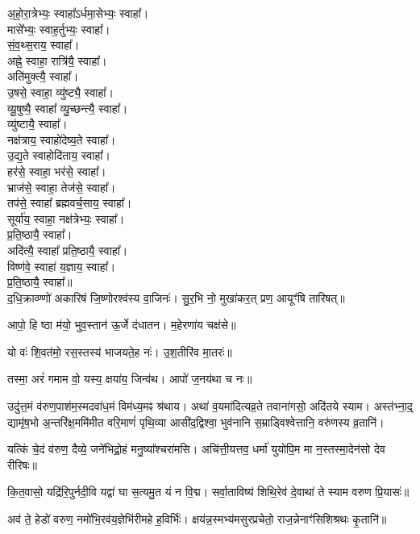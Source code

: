 अ॒हो॒रा॒त्रेभ्यः॒ स्वाहा᳚ऽर्धमा॒सेभ्यः॒ स्वाहा᳚।\\
मासे᳚भ्यः॒ स्वाह॒र्तुभ्यः॒ स्वाहा᳚।\\
सं॒व॒थ्स॒राय॒ स्वाहा᳚।\\
अह्ने॒ स्वाहा॒ रात्रि॑यै॒ स्वाहा᳚।\\
अति॑मुक्त्यै॒ स्वाहा᳚।\\
उ॒षसे॒ स्वाहा॒ व्यु॑ष्ट्यै॒ स्वाहा᳚।\\
व्यू॒षुष्यै॒ स्वाहा᳚ व्यु॒च्छन्त्यै॒ स्वाहा᳚।\\
व्यु॑ष्टायै॒ स्वाहा᳚।\\
नक्ष॑त्राय॒ स्वाहो॑देष्य॒ते स्वाहा᳚।\\
उ॒द्य॒ते स्वाहोदि॑ताय॒ स्वाहा᳚।\\
हर॑से॒ स्वाहा॒ भर॑से॒ स्वाहा᳚।\\
भ्राज॑से॒ स्वाहा॒ तेज॑से॒ स्वाहा᳚।\\
तप॑से॒ स्वाहा᳚ ब्रह्मवर्च॒साय॒ स्वाहा᳚।\\
सूर्या॑य॒ स्वाहा॒ नक्ष॑त्रेभ्यः॒ स्वाहा᳚।\\
प्र॒ति॒ष्ठायै॒ स्वाहा᳚।\\
अदि॑त्यै॒ स्वाहा᳚ प्रति॒ष्ठायै॒ स्वाहा᳚।\\
विष्ण॑वे॒ स्वाहा॑ य॒ज्ञाय॒ स्वाहा᳚।\\
प्र॒ति॒ष्ठायै॒ स्वाहा᳚॥\\

द॒धि॒क्राव्ण्णो॑ अकारिषं जि॒ष्णोरश्व॑स्य वा॒जिनः॑।
सु॒र॒भि नो॒ मुखा॑कर॒त् प्रण॒ आयूꣳ॑षि तारिषत्॥

आपो॒ हि ष्ठा म॑यो॒ भुव॒स्तान॑ ऊ॒र्जे द॑धातन। म॒हेरणा॑य चक्ष॑से॥

यो वः॑ शि॒वत॑मो॒ रस॒स्तस्य॑ भाजयते॒ह नः॑। उ॒श॒तीरि॑व मा॒तरः॑॥

तस्मा॒ अरं॑ गमाम वो॒ यस्य॒ क्षया॑य॒ जिन्व॑थ। आपो॑ ज॒नय॑था च नः॥

उदु॑त्त॒मं व॑रुण॒पाश॑म॒स्मदवा॑ध॒मं विम॑ध्य॒मꣴ श्र॑थाय।
अथा॑ व॒यमा॑दित्यव्र॒ते तवाना॑गसो॒ अदि॑तये स्याम।
अस्त॑भ्ना॒द्॒ द्यामृ॑ष॒भो अ॒न्तरि॑क्ष॒ममि॑मीत वरि॒माणं॑ पृथि॒व्या
आसी॑द॒द्विश्वा॒ भुव॑नानि स॒म्राड्विश्वेत्तानि॒ वरु॑णस्य व्र॒तानि॑।

यत्किं चे॒दं व॑रुण॒ दैव्ये॒ जने॑भिद्रो॒हं मनु॒ष्या᳚श्चरा॑मसि। 
अचि॑त्ती॒यत्तव॒ धर्मा॑ युयोपि॒म मा न॒स्तस्मा॒देन॑सो देव रीरिषः॥

कि॒त॒वासो॒ यद्रि॑रि॒पुर्नदी॒वि यद्वा॑ घा स॒त्यमु॒त यं न वि॒द्म। 
सर्वा॒ताविष्य॑ शिथि॒रेव॑ दे॒वाथा॑ ते स्याम वरुण प्रि॒यासः॑॥

अव॑ ते॒ हेडो॑ वरुण॒ नमो॑भि॒रव॑य॒ज्ञेभि॑रीमहे ह॒विर्भिः॑।
क्षय॑न्न॒स्मभ्य॑मसुरप्रचेतो॒ राज॒न्नेनाꣳ॑सिशिश्रथः कृ॒तानि॑॥

